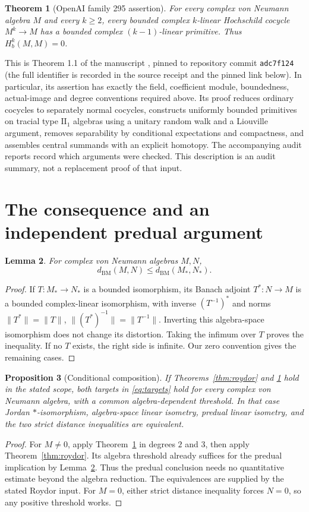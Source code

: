 \documentclass[11pt]{article}
\newtheorem{theorem}{Theorem}
\newtheorem{proposition}[theorem]{Proposition}
\newtheorem{lemma}[theorem]{Lemma}
\newcommand{\BM}{d_{\mathrm{BM}}}
\newcommand{\Hb}{H_b}
\begin{document}
\begin{theorem}[OpenAI family 295 assertion]\label{thm:input}
For every complex von Neumann algebra $M$ and every $k\ge2$, every
bounded complex $k$-linear Hochschild cocycle $M^k\to M$ has a
bounded complex $(k-1)$-linear primitive. Thus $\Hb^k(M,M)=0$.
\end{theorem}

This is Theorem 1.1 of the manuscript \cite{OAI295}, pinned to repository
commit \texttt{adc7f124} (the full identifier is recorded in the
source receipt and the pinned link below). In particular,
its assertion has exactly the field, coefficient module, boundedness,
actual-image and degree conventions required above. Its proof reduces
ordinary cocycles to separately normal cocycles, constructs uniformly
bounded primitives on tracial type $\mathrm{II}_1$ algebras using a
unitary random walk and a Liouville argument, removes separability by
conditional expectations and compactness, and assembles central
summands with an explicit homotopy. The accompanying audit reports
record which arguments were checked. This description is an audit
summary, not a replacement proof of that input.

\section{The consequence and an independent predual argument}

\begin{lemma}\label{lem:adjoint}
For complex von Neumann algebras $M,N$,
\[
 \BM(M,N)\le\BM(M_*,N_*).
\]
\end{lemma}
\begin{proof}
If $T:M_*\to N_*$ is a bounded isomorphism, its Banach adjoint
$T^*:N\to M$ is a bounded complex-linear isomorphism, with inverse
$(T^{-1})^*$ and norms $\|T^*\|=\|T\|$,
$\|(T^*)^{-1}\|=\|T^{-1}\|$. Inverting this algebra-space
isomorphism does not change its distortion. Taking the infimum over
$T$ proves the inequality. If no $T$ exists, the right side is
infinite. Our zero convention gives the remaining cases.
\end{proof}

\begin{proposition}[Conditional composition]\label{prop:consequence}
If Theorems~\ref{thm:roydor} and \ref{thm:input} hold in the stated
scope, both targets in \eqref{eq:targets} hold for every complex von
Neumann algebra, with a common algebra-dependent threshold. In that
case Jordan $*$-isomorphism, algebra-space linear isometry, predual
linear isometry, and the two strict distance inequalities are equivalent.
\end{proposition}
\begin{proof}
For $M\ne0$, apply Theorem~\ref{thm:input} in degrees $2$ and $3$,
then apply Theorem~\ref{thm:roydor}. Its algebra threshold already
suffices for the predual implication by Lemma~\ref{lem:adjoint}.
Thus the predual conclusion needs no quantitative estimate beyond the
algebra reduction. The equivalences are supplied by the stated Roydor
input. For $M=0$, either strict distance inequality forces $N=0$,
so any positive threshold works.
\end{proof}
\end{document}

